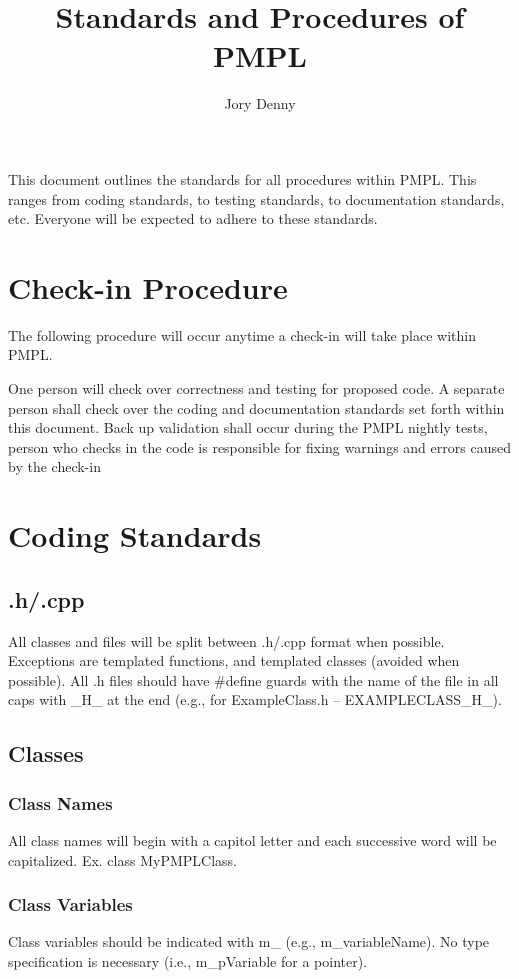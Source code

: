 \documentclass[12pt]{article}
\title{\Large \bf Standards and Procedures of PMPL}
\author{Jory Denny}
\begin{document}
\thispagestyle{empty}
\pagestyle{empty}
\maketitle

This document outlines the standards for all procedures within PMPL. This ranges from coding standards, to testing
standards, to documentation standards, etc. Everyone will be expected to adhere to these standards.

\section{Check-in Procedure}
The following procedure will occur anytime a check-in will take place within PMPL.
\begin{algorithmic}[1]
\STATE One person will check over correctness and testing for proposed code.
\STATE A separate person shall check over the coding and documentation standards set forth within this document.
\STATE Back up validation shall occur during the PMPL nightly tests, person who checks in the code is responsible for
fixing warnings and errors caused by the check-in
\end{algorithmic}

\section{Coding Standards}

\subsection{.h/.cpp}
All classes and files will be split between .h/.cpp format when possible. Exceptions are templated functions, and templated
classes (avoided when possible). All .h files should have \#define guards with the name of the file in all caps with
\_H\_ at the end (e.g., for ExampleClass.h -- EXAMPLECLASS\_H\_).

\subsection{Classes}
\subsubsection{Class Names}
All class names will begin with a capitol letter and each successive word will be capitalized. Ex. class MyPMPLClass.

\subsubsection{Class Variables}
Class variables should be indicated with m\_ (e.g., m\_variableName). No type specification is necessary (i.e.,
m\_pVariable for a pointer).
\end{document}
